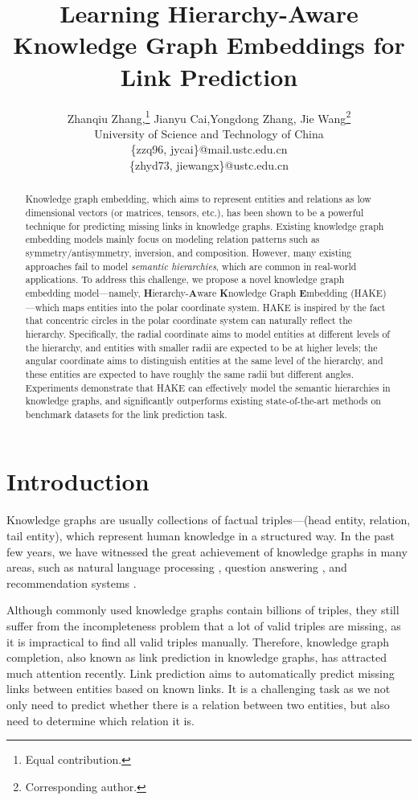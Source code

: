 \documentclass[letterpaper]{article} \usepackage{aaai20}  \usepackage{times}  \usepackage{helvet} \usepackage{courier}  \usepackage[hyphens]{url}  \usepackage{graphicx} \urlstyle{rm} \def\UrlFont{\rm}  \usepackage{graphicx}  \frenchspacing  \setlength{\pdfpagewidth}{8.5in}  \setlength{\pdfpageheight}{11in}
\title{Learning Hierarchy-Aware Knowledge Graph Embeddings for Link Prediction}
\author{Zhanqiu Zhang,\thanks{Equal contribution.} Jianyu Cai,\footnotemark[1] Yongdong Zhang, Jie Wang\thanks{Corresponding author.}\\
University of Science and Technology of China\\ 
\{zzq96, jycai\}@mail.ustc.edu.cn\\
\{zhyd73, jiewangx\}@ustc.edu.cn
}
\newcommand{\citep}{\cite}
\begin{document}
\maketitle

\begin{abstract}
Knowledge graph embedding, which aims to represent entities and relations as low dimensional vectors (or matrices, tensors, etc.), has been shown to be a powerful technique for predicting missing links in knowledge graphs. Existing knowledge graph embedding models mainly focus on modeling relation patterns such as symmetry/antisymmetry, inversion, and composition. However, many existing approaches fail to model \textit{semantic hierarchies}, which are common in real-world applications. To address this challenge, we propose a novel knowledge graph embedding model---namely, \textbf{H}ierarchy-\textbf{A}ware \textbf{K}nowledge Graph \textbf{E}mbedding (HAKE)---which maps entities into the polar coordinate system. HAKE is inspired by the fact that concentric circles in the polar coordinate system can naturally reflect the hierarchy. Specifically, the radial coordinate aims to model entities at different levels of the hierarchy, and entities with smaller radii are expected to be at higher levels; the angular coordinate aims to distinguish entities at the same level of the hierarchy, and these entities are expected to have roughly the same radii but different angles. Experiments demonstrate that HAKE can effectively model the semantic hierarchies in knowledge graphs, and significantly outperforms existing state-of-the-art methods on benchmark datasets for the link prediction task. 
\end{abstract}


\section{Introduction}

Knowledge graphs are usually collections of factual triples---(head entity, relation, tail entity), which represent human knowledge in a structured way. In the past few years, we have witnessed the great achievement of knowledge graphs in many areas, such as natural language processing \citep{ernie}, question answering \citep{KGQA}, and recommendation systems \citep{KGRS}.


Although commonly used knowledge graphs contain billions of triples, they still suffer from the incompleteness problem that a lot of valid triples are missing, as it is impractical to find all valid triples manually. Therefore, knowledge graph completion, also known as link prediction in knowledge graphs, has attracted much attention recently. Link prediction aims to automatically predict missing links between entities based on known links. It is a challenging task as we not only need to predict whether there is a relation between two entities, but also need to determine which relation it is.
\end{document}

